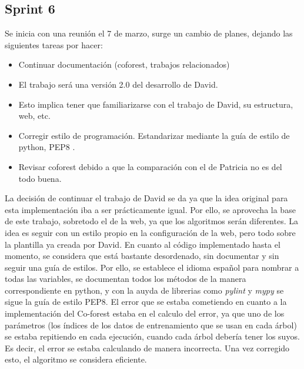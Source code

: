 \subsection{Sprint 6}
Se inicia con una reunión el 7 de marzo, surge un cambio de planes, dejando las siguientes tareas por hacer:
\begin{itemize}
	\item Continuar documentación (coforest, trabajos relacionados)
	\item El trabajo será una versión 2.0 del desarrollo de David.
	\item Esto implica tener que familiarizarse con el trabajo de David, su estructura, web, etc.
	\item Corregir estilo de programación. Estandarizar mediante la guía de estilo de python, PEP8 \cite{PEP8}. %
	\item Revisar coforest debido a que la comparación con el de Patricia no es del todo buena.
	
\end{itemize} 
La decisión de continuar el trabajo de David se da ya que la idea original para esta implementación iba a ser prácticamente igual. Por ello, se aprovecha la base de este trabajo, sobretodo el de la web, ya que los algoritmos serán diferentes. La idea es seguir con un estilo propio en la configuración de la web, pero todo sobre la plantilla ya creada por David. 
En cuanto al código implementado hasta el momento, se considera que está bastante desordenado, sin documentar y sin seguir una guía de estilos. Por ello, se establece el idioma español para nombrar a todas las variables, se documentan todos los métodos de la manera correspondiente en python, y con la auyda de librerias como \textit{pylint} y \textit{mypy} se sigue la guía de estilo PEP8.
El error que se estaba cometiendo en cuanto a la implementación del Co-forest estaba en el calculo del error, ya que uno de los parámetros (los índices de los datos de entrenamiento que se usan en cada árbol) se estaba repitiendo en cada ejecución, cuando cada árbol debería tener los suyos. Es decir, el error se estaba calculando de manera incorrecta. Una vez corregido esto, el algoritmo se considera eficiente.

